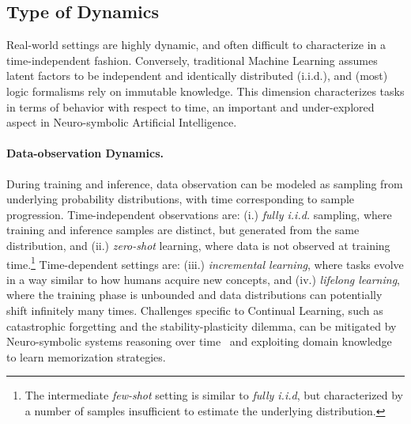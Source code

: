 \subsection{Type of Dynamics}
Real-world settings are highly dynamic, and often difficult to characterize in a time-independent fashion. Conversely, traditional Machine Learning assumes latent factors to be independent and identically distributed (i.i.d.), and (most) logic formalisms rely on immutable knowledge.
This dimension characterizes tasks in terms of behavior with respect to time, an important and under-explored aspect in Neuro-symbolic Artificial Intelligence. 

\paragraph{Data-observation Dynamics.} During training and inference, data observation can be modeled as sampling from underlying probability distributions, with time corresponding to sample progression. Time-independent observations are: (i.) \textit{fully i.i.d.} sampling, where training and inference samples are distinct, but generated from the same distribution, and (ii.) \textit{zero-shot} learning, where data is not observed at training time.\footnote{The intermediate \textit{few-shot} setting is similar to \textit{fully i.i.d}, but characterized by a number of samples insufficient to estimate the underlying distribution.}
Time-dependent settings are: (iii.) \textit{incremental learning}, where tasks evolve in a way similar to how humans acquire new concepts, and (iv.) \textit{lifelong learning}, where the training phase is unbounded and data distributions can potentially shift infinitely many times.
Challenges specific to Continual Learning, such as catastrophic forgetting and the stability-plasticity dilemma, can be mitigated by Neuro-symbolic systems reasoning over time~\cite{marconato2023neuro} and exploiting domain knowledge to learn memorization strategies.


